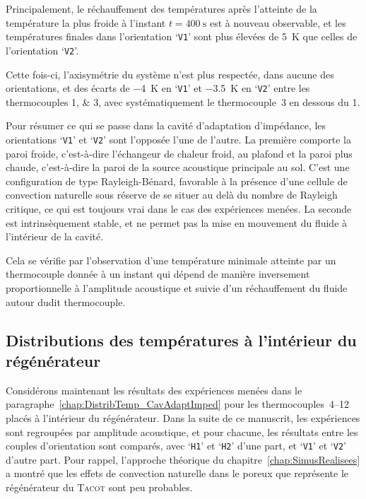 Principalement, le réchauffement des températures après l'atteinte de la température la plus froide à l'instant $t=\qty{400}{\second}$ est à nouveau observable, et les températures finales dans l'orientation `\texttt{V1}' sont plus élevées de \qty{5}{\kelvin} que celles de l'orientation `\texttt{V2}'.\smallskip

Cette fois-ci, l'axisymétrie du système n'est plus respectée, dans aucune des orientations, et des écarts de \qty{-4}{\kelvin} en `\texttt{V1}' et \qty{-3.5}{\kelvin} en `\texttt{V2}' entre les thermocouples \numlist{1;3}, avec systématiquement le thermocouple~\num{3} en dessous du \num{1}.\bigskip


Pour résumer ce qui se passe dans la cavité d'adaptation d'impédance, les orientations `\texttt{V1}' et `\texttt{V2}' sont l'opposée l'une de l'autre. La première comporte la paroi froide, c'est-à-dire l'échangeur de chaleur froid, au plafond et la paroi plus chaude, c'est-à-dire la paroi de la source acoustique principale au sol. C'est une configuration de type Rayleigh-Bénard, favorable à la présence d'une cellule de convection naturelle sous réserve de se situer au delà du nombre de Rayleigh critique, ce qui est toujours vrai dans le cas des expériences menées. La seconde est intrinsèquement stable, et ne permet pas la mise en mouvement du fluide à l'intérieur de la cavité.

Cela se vérifie par l'observation d'une température minimale atteinte par un thermocouple donnée à un instant qui dépend de manière inversement proportionnelle à l'amplitude acoustique et suivie d'un réchauffement du fluide autour dudit thermocouple.

\subsection{Distributions des températures à l'intérieur du régénérateur}\label{chap:DistribTemp_Regen}
Considérons maintenant les résultats des expériences menées dans le paragraphe~\ref{chap:DistribTemp_CavAdaptImped} pour les thermocouples~\numrange{4}{12} placés à l'intérieur du régénérateur. Dans la suite de ce manuscrit, les expériences sont regroupées par amplitude acoustique, et pour chacune, les résultats entre les couples d'orientation sont comparés, avec `\texttt{H1}' et `\texttt{H2}' d'une part, et `\texttt{V1}' et `\texttt{V2}' d'autre part. Pour rappel, l'approche théorique du chapitre~\ref{chap:SimusRealisees} a montré que les effets de convection naturelle dans le poreux que représente le régénérateur du \textsc{Tacot} sont peu probables.




